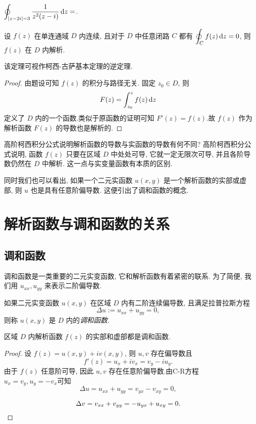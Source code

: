 \begin{exercise}
	$\displaystyle\oint_{|z-2i|=3}\frac1{z^2(z-i)}\,\mathrm{d} z=$.
\end{exercise}

\begin{example}[莫累拉定理]
	设 $f(z)$ 在单连通域 $D$ 内连续, 且对于 $D$ 中任意闭路 $C$ 都有 $\displaystyle\oint_Cf(z)\,\mathrm{d} z=0$, 则 $f(z)$ 在 $D$ 内解析.
\end{example}

该定理可视作柯西-古萨基本定理的逆定理.

\begin{proof}
	由题设可知 $f(z)$ 的积分与路径无关.
	{固定 $z_0\in D$, 则
		\[F(z)=\int_{z_0}^zf(z)\,\mathrm{d} z\]
	定义了 $D$ 内的一个函数.类似于原函数的证明可知 $F'(z)=f(z)$.故 $f(z)$ 作为解析函数 $F(z)$ 的导数也是解析的.\qedhere}
\end{proof}

高阶柯西积分公式说明解析函数的导数与实函数的导数有何不同?
高阶柯西积分公式说明, 函数 $f(z)$ 只要在区域 $D$ 中处处可导, 它就一定无限次可导, 并且各阶导数仍然在 $D$ 中解析.
\alert{这一点与实变量函数有本质的区别.}

同时我们也可以看出, 如果一个二元实函数 $u(x,y)$ 是一个解析函数的实部或虚部, 则 $u$ 也是具有任意阶偏导数.
这便引出了调和函数的概念.

\section{解析函数与调和函数的关系}

\subsection{调和函数}

调和函数是一类重要的二元实变函数, 它和解析函数有着紧密的联系.
为了简便, 我们用 $u_{xx},u_{yy}$ 来表示二阶偏导数.

\begin{definition}
	如果二元实变函数 $u(x,y)$ 在区域 $D$ 内有二阶连续偏导数, 且满足拉普拉斯方程
	\[\Delta u:=u_{xx}+u_{yy}=0,\]
	则称 $u(x,y)$ 是 $D$ 内的\emph{调和函数}.
\end{definition}

\begin{theorem}
	区域 $D$ 内解析函数 $f(z)$ 的实部和虚部都是调和函数.
\end{theorem}

\begin{proof}
	设 $f(z)=u(x,y)+iv(x,y)$, 则 $u,v$ 存在偏导数且
		\[f'(z)=u_x+iv_x=v_y-iu_y.\]
	{由于 $f(z)$ 任意阶可导, 因此 $u,v$ 存在任意阶偏导数.由C-R方程 $u_x=v_y,u_y=-v_x$可知
		\[\Delta u=u_{xx}+u_{yy}=v_{yx}-v_{xy}=0,\]}

	{
		\[\Delta v=v_{xx}+v_{yy}=-u_{yx}+u_{xy}=0.\qedhere\]}
\end{proof}

